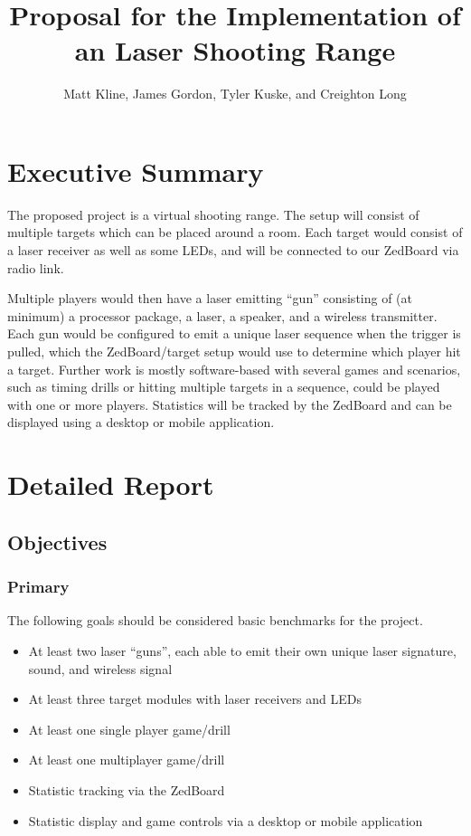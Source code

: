 \documentclass{article}
\title{Proposal for the Implementation of an Laser Shooting Range}
\author{Matt Kline, James Gordon, Tyler Kuske, and Creighton Long}
\begin{document}
\maketitle
\newpage
\tableofcontents
\newpage

\section{Executive Summary}

The proposed project is a virtual shooting range.
The setup will consist of multiple targets which can be placed around a room.
Each target would consist of a laser receiver as well as some LEDs, and will be connected to our ZedBoard via radio link.

Multiple players would then have a laser emitting ``gun''
consisting of (at minimum) a processor package, a laser, a speaker, and a wireless transmitter.
Each gun would be configured to emit a unique laser sequence when the trigger is pulled,
which the ZedBoard/target setup would use to determine which player hit a target.
Further work is mostly software-based with several games and scenarios,
such as timing drills or hitting multiple targets in a sequence, could be played with one or more players.
Statistics will be tracked by the ZedBoard and can be displayed using a desktop or mobile application.

\newpage

\section{Detailed Report}

\subsection{Objectives}

\subsubsection{Primary}

The following goals should be considered basic benchmarks for the project.

\begin{itemize}
\item At least two laser ``guns'', each able to emit their own unique laser signature, sound, and wireless signal
\item At least three target modules with laser receivers and LEDs
\item At least one single player game/drill
\item At least one multiplayer game/drill
\item Statistic tracking via the ZedBoard
\item Statistic display and game controls via a desktop or mobile application
\end{itemize}
\end{document}
